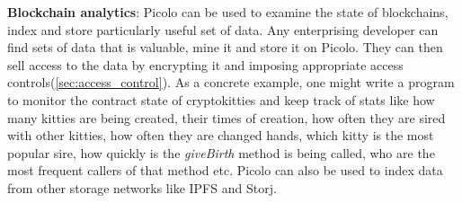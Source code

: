 \textbf{Blockchain analytics}: Picolo can be used to examine the state of blockchains, index and store particularly useful set of data. Any enterprising developer can find sets of data that is valuable, mine it and store it on Picolo. They can then sell access to the data by encrypting it and imposing appropriate access controls(\cref{sec:access_control}). As a concrete example, one might write a program to monitor the contract state of cryptokitties and keep track of stats like how many kitties are being created, their times of creation, how often they are sired with other kitties, how often they are changed hands, which kitty is the most popular sire, how quickly is the \textit{giveBirth} method is being called, who are the most frequent callers of that method etc. Picolo can also be used to index data from other storage networks like IPFS and Storj. 

